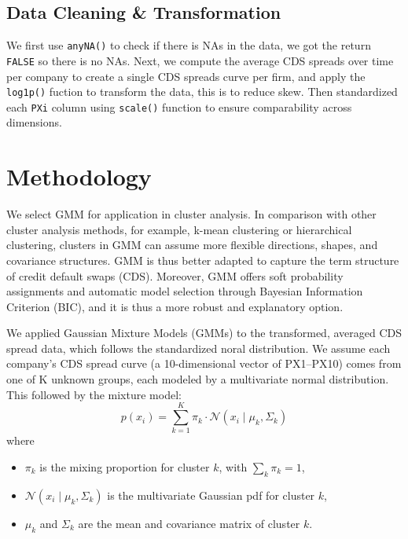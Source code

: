 \documentclass[
  letterpaper,
  DIV=11,
  numbers=noendperiod]{scrartcl}
\begin{document}
\hypertarget{data-cleaning-transformation}{%
\subsection{Data Cleaning \&
Transformation}\label{data-cleaning-transformation}}

We first use \texttt{anyNA()} to check if there is NAs in the data, we
got the return \texttt{FALSE} so there is no NAs. Next, we compute the
average CDS spreads over time per company to create a single CDS spreads
curve per firm, and apply the \texttt{log1p()} fuction to transform the
data, this is to reduce skew. Then standardized each \texttt{PXi} column
using \texttt{scale()} function to ensure comparability across
dimensions.

\hypertarget{methodology}{%
\section{Methodology}\label{methodology}}

We select GMM for application in cluster analysis. In comparison with
other cluster analysis methods, for example, k-mean clustering or
hierarchical clustering, clusters in GMM can assume more flexible
directions, shapes, and covariance structures. GMM is thus better
adapted to capture the term structure of credit default swaps (CDS).
Moreover, GMM offers soft probability assignments and automatic model
selection through Bayesian Information Criterion (BIC), and it is thus a
more robust and explanatory option.

We applied Gaussian Mixture Models (GMMs) to the transformed, averaged
CDS spread data, which follows the standardized noral distribution. We
assume each company's CDS spread curve (a 10-dimensional vector of
PX1--PX10) comes from one of K unknown groups, each modeled by a
multivariate normal distribution. This followed by the mixture model: \[
p(x_i) = \sum_{k=1}^{K} \pi_k \cdot \mathcal{N}(x_i \mid \mu_k, \Sigma_k)
\] where

\begin{itemize}
\item
  \(\pi_k\) is the mixing proportion for cluster \(k\), with
  \(\sum_k \pi_k = 1\),
\item
  \(\mathcal{N}(x_i \mid \mu_k, \Sigma_k)\) is the multivariate Gaussian
  pdf for cluster \(k\),
\item
  \(\mu_k\) and \(\Sigma_k\) are the mean and covariance matrix of
  cluster \(k\).
\end{itemize}
\end{document}
